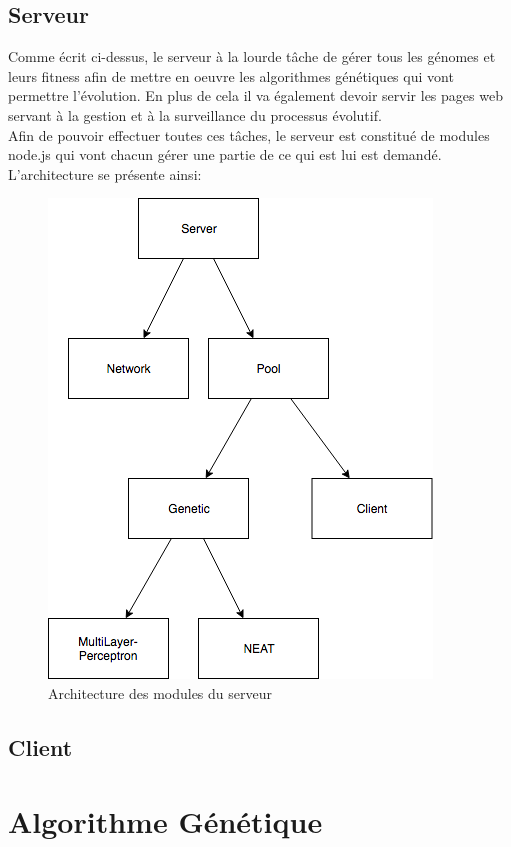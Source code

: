 \documentclass{article}
\begin{document}
\subsection{Serveur}

Comme écrit ci-dessus, le serveur à la lourde tâche de gérer tous les génomes et leurs fitness afin de mettre en oeuvre les algorithmes génétiques qui vont permettre l'évolution. En plus de cela il va également devoir servir les pages web servant à la gestion et à la surveillance du processus évolutif.\\
Afin de pouvoir effectuer toutes ces tâches, le serveur est constitué de modules node.js qui vont chacun gérer une partie de ce qui est lui est demandé.\\
L'architecture se présente ainsi:
\begin{figure}
\begin{center}
	\includegraphics[scale=0.75]{"server.png"} 
	\caption{Architecture des modules du serveur}
\end{center}
\end{figure}



\subsection{Client}

\section{Algorithme Génétique}
\end{document}
